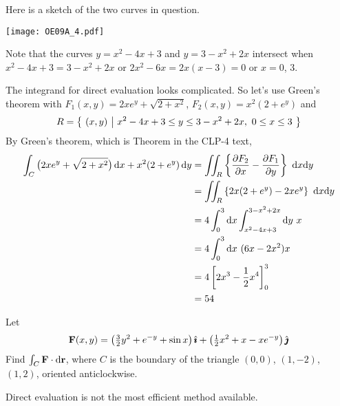 \begin{solution} 
Here is a sketch of the two curves in question.

\begin{center}
       \texttt{[image: OE09A\_4.pdf]}
\end{center}

Note that the curves $y = x^2 - 4x+3$ and $y = 3 - x^2 + 2x$
intersect when $x^2 - 4x+3 = 3 - x^2 + 2x$ or $2x^2-6x=2x(x-3)=0$ or
$x=0$, $3$. 

The integrand for direct evaluation looks complicated. So
let's use Green's theorem with 
$F_1(x,y) = 2xe^y + \sqrt{2 + x^2}$, $F_2(x,y)= x^2 (2 + e^y)$
and 
\begin{equation*}
R=\big\{ \ (x,y)\ \big|\ x^2 - 4x+3 \le y\le 3 - x^2 + 2x,\ 0\le x\le 3\ \big\}
\end{equation*}
By Green's theorem, which is Theorem  
in the CLP-4 text,
\begin{align*}
\int_C \big(2xe^y + \sqrt{2 + x^2}\big)\, \dee{x} 
            + x^2 (2 + e^y)\, \dee{y}
&=\dblInt_R\left\{\frac{\partial F_2}{\partial x}
                 -\frac{\partial F_1}{\partial y}\right\}\ \dee{x}\dee{y} \\
&=\dblInt_R\left\{2x(2+e^y) - 2xe^y\right\}\ \dee{x}\dee{y} \\
&=4 \int_0^3\dee{x} \int_{x^2 - 4x+3}^{3 - x^2 + 2x}\dee{y}\ x \\
&=4 \int_0^3\dee{x}\ (6x-2x^2) x \\
&=4\left[2x^3-\frac{1}{2}x^4\right]_0^3 \\
&=54
\end{align*}


\end{solution}


\begin{question}[M317 2006A] %
Let
\begin{align*}
\mathbf{F}(x,y) = \big(\tfrac{3}{2}y^2 + e^{-y} +\sin x\big)\,\hat{\pmb{\imath}}
           +\big(\tfrac{1}{2}x^2+x-x e^{-y}\big)\,\hat{\pmb{\jmath}}
\end{align*}
Find $\int_C\mathbf{F}\cdot\mathrm{d}\mathbf{r}$, where $C$ is the boundary of the triangle
$(0,0)$, $(1,-2)$, $(1,2)$, oriented anticlockwise.

\end{question}

\begin{hint} 
Direct evaluation is not the most efficient method available.
\end{hint}

